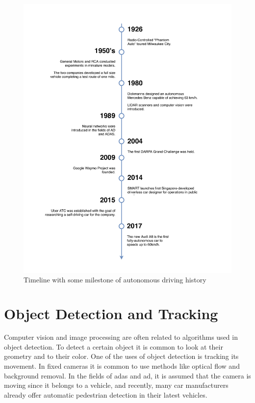 \begin{figure}[htp]
	
	\centering
	\includegraphics[width=1\textwidth]{capstate/imgs/timeline.pdf}
	
	\caption{Timeline with some milestone of autonomous driving history}
	\label{fig:timeline}
	
\end{figure}

\section{Object Detection and Tracking}
Computer vision and image processing are often related to algorithms used in object detection. To detect a certain object it is common to look at their geometry and to their color. One of the uses of object detection is tracking its movement. In fixed cameras it is common to use methods like optical flow and background removal. In the fields of \gls{adas} and \gls{ad}, it is assumed that the camera is moving since it belongs to a vehicle, and recently, many car manufacturers already offer automatic pedestrian detection in their latest vehicles. 

